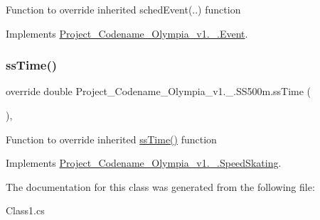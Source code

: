 Function to override inherited sched\+Event(..) function 

Implements \hyperlink{classProject__Codename__Olympia__v1_1_1__0_1_1Event_abb4e2b9c28527b9a28395f2fe9192196}{Project\+\_\+\+Codename\+\_\+\+Olympia\+\_\+v1.\+\_.\+Event}.

\mbox{\label{classProject__Codename__Olympia__v1_1_1__0_1_1SS500m_a1fc1ed5e2b6d1fa4d1921a3d155c6a6f}} 
\subsubsection{\texorpdfstring{ss\+Time()}{ssTime()}}
{\footnotesize\ttfamily override double Project\+\_\+\+Codename\+\_\+\+Olympia\+\_\+v1.\+\_.\+S\+S500m.\+ss\+Time (\begin{DoxyParamCaption}{ }\end{DoxyParamCaption})\hspace{0.3cm}{\ttfamily [inline]}, {\ttfamily [virtual]}}

Function to override inherited \hyperlink{classProject__Codename__Olympia__v1_1_1__0_1_1SS500m_a1fc1ed5e2b6d1fa4d1921a3d155c6a6f}{ss\+Time()} function 

Implements \hyperlink{classProject__Codename__Olympia__v1_1_1__0_1_1SpeedSkating_acedc7b2f1bfab95ee054531364ea50fb}{Project\+\_\+\+Codename\+\_\+\+Olympia\+\_\+v1.\+\_.\+Speed\+Skating}.



The documentation for this class was generated from the following file\+:\begin{DoxyCompactItemize}
\item 
Class1.\+cs\end{DoxyCompactItemize}
